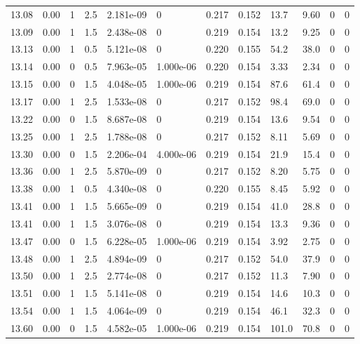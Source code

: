 \documentclass[preview]{standalone}
\begin{document}
{{{{{{\begin{tabular}{L{1.2cm}C{1.2cm} C{0.3cm}C{0.5cm} C{1.4cm}C{1.4cm} C{1.4cm}C{1.4cm} C{1.6cm}C{1.6cm} C{1.6cm}C{1.6cm}}
  13.08  &  0.00  & 1     & 2.5 &  2.181e-09  & 0  &  0.217&   0.152& 13.7 & 9.60   &  0 & 0  \\ 
  13.09  &  0.00  & 1     & 1.5 &  2.438e-08  & 0  &  0.219&   0.154& 13.2 & 9.25   &  0 & 0  \\ 
  13.13  &  0.00  & 1     & 0.5 &  5.121e-08  & 0  &  0.220&   0.155& 54.2 & 38.0   &  0 & 0  \\ 
  13.14  &  0.00  & 0     & 0.5 &  7.963e-05  & 1.000e-06  &  0.220&   0.154& 3.33 & 2.34   &  0 & 0  \\ 
  13.15  &  0.00  & 0     & 1.5 &  4.048e-05  & 1.000e-06  &  0.219&   0.154& 87.6 & 61.4   &  0 & 0  \\ 
  13.17  &  0.00  & 1     & 2.5 &  1.533e-08  & 0  &  0.217&   0.152& 98.4 & 69.0   &  0 & 0  \\ 
  13.22  &  0.00  & 0     & 1.5 &  8.687e-08  & 0  &  0.219&   0.154& 13.6 & 9.54   &  0 & 0  \\ 
  13.25  &  0.00  & 1     & 2.5 &  1.788e-08  & 0  &  0.217&   0.152& 8.11 & 5.69   &  0 & 0  \\ 
  13.30  &  0.00  & 0     & 1.5 &  2.206e-04  & 4.000e-06  &  0.219&   0.154& 21.9 & 15.4   &  0 & 0  \\ 
  13.36  &  0.00  & 1     & 2.5 &  5.870e-09  & 0  &  0.217&   0.152& 8.20 & 5.75   &  0 & 0  \\ 
  13.38  &  0.00  & 1     & 0.5 &  4.340e-08  & 0  &  0.220&   0.155& 8.45 & 5.92   &  0 & 0  \\ 
  13.41  &  0.00  & 1     & 1.5 &  5.665e-09  & 0  &  0.219&   0.154& 41.0 & 28.8   &  0 & 0  \\ 
  13.41  &  0.00  & 1     & 1.5 &  3.076e-08  & 0  &  0.219&   0.154& 13.3 & 9.36   &  0 & 0  \\ 
  13.47  &  0.00  & 0     & 1.5 &  6.228e-05  & 1.000e-06  &  0.219&   0.154& 3.92 & 2.75   &  0 & 0  \\ 
  13.48  &  0.00  & 1     & 2.5 &  4.894e-09  & 0  &  0.217&   0.152& 54.0 & 37.9   &  0 & 0  \\ 
  13.50  &  0.00  & 1     & 2.5 &  2.774e-08  & 0  &  0.217&   0.152& 11.3 & 7.90   &  0 & 0  \\ 
  13.51  &  0.00  & 1     & 1.5 &  5.141e-08  & 0  &  0.219&   0.154& 14.6 & 10.3   &  0 & 0  \\ 
  13.54  &  0.00  & 1     & 1.5 &  4.064e-09  & 0  &  0.219&   0.154& 46.1 & 32.3   &  0 & 0  \\ 
  13.60  &  0.00  & 0     & 1.5 &  4.582e-05  & 1.000e-06  &  0.219&   0.154& 101.0 & 70.8   &  0 & 0  \\ 

\end{tabular}}}}}}}
\end{document}
